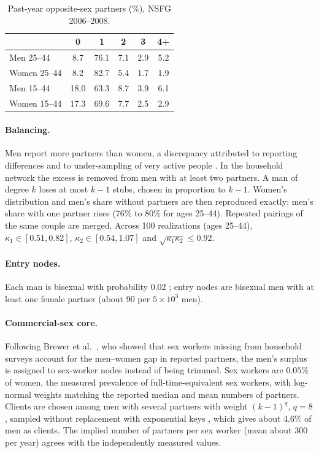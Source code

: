 \documentclass[pre,onecolumn,superscriptaddress,amsmath,amssymb,floatfix]{revtex4-2}
\theoremstyle{definition}
\theoremstyle{remark}
\begin{document}
\begin{table}[h]
\caption{Past-year opposite-sex partners (\%), NSFG 2006--2008.}
\label{tab:nsfg}
\begin{ruledtabular}
\begin{tabular}{lccccc}
 & 0 & 1 & 2 & 3 & 4+ \\ \hline
Men 25--44 & 8.7 & 76.1 & 7.1 & 2.9 & 5.2 \\
Women 25--44 & 8.2 & 82.7 & 5.4 & 1.7 & 1.9 \\
Men 15--44 & 18.0 & 63.3 & 8.7 & 3.9 & 6.1 \\
Women 15--44 & 17.3 & 69.6 & 7.7 & 2.5 & 2.9 \\
\end{tabular}
\end{ruledtabular}
\end{table}

\paragraph{Balancing.} Men report more partners than women, a discrepancy
attributed to reporting differences and to under-sampling of very active
people \cite{brewer2000prostitution,mitchell2019why}. In the household
network the excess is removed from men with at least two partners. A man of
degree $k$ loses at most $k-1$ stubs, chosen in proportion to $k-1$. Women's
distribution and men's share without partners are then reproduced exactly;
men's share with one partner rises (76\% to 80\% for ages 25--44). Repeated
pairings of the same couple are merged. Across 100 realizations (ages
25--44), $\kappa_1\in[0.51,0.82]$, $\kappa_2\in[0.54,1.07]$ and $\sqrt{\kappa_1\kappa_2}\le0.92$.

\paragraph{Entry nodes.} Each man is bisexual with probability 0.02
\cite{copen2016sexual}; entry nodes are bisexual men with at least one female
partner (about 90 per $5\times10^3$ men).

\paragraph{Commercial-sex core.} Following Brewer et al.\ \cite{brewer2000prostitution},
who showed that sex workers missing from household surveys account for the
men--women gap in reported partners, the men's surplus is assigned to sex-worker
nodes instead of being trimmed. Sex workers are $0.05\%$ of women, the measured
prevalence of full-time-equivalent sex workers, with log-normal weights
matching the reported median and mean numbers of partners. Clients are chosen among men
with several partners with weight $(k-1)^q$, $q=8$, sampled without replacement
with exponential keys \cite{efraimidis2006weighted}, which gives about 4.6\% of men as
clients. The implied number of partners per sex worker (mean about 300 per
year) agrees with the independently measured values.
\end{document}
